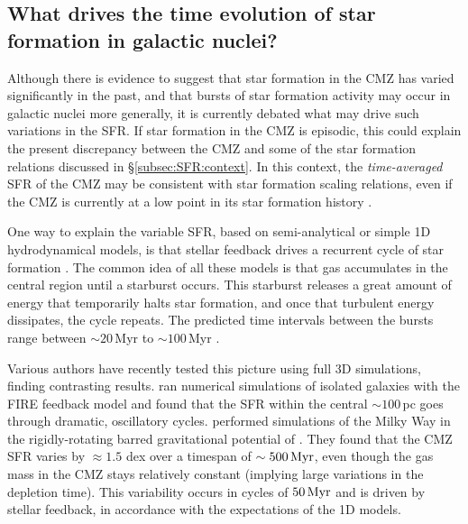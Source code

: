 \subsection{What drives the time evolution of star formation in galactic nuclei?}
\label{subsec:SFR:timeevolution}

Although there is evidence to suggest that star formation in the CMZ has varied significantly in the past, and that bursts of star formation activity may occur in galactic nuclei more generally, it is currently debated what may drive such variations in the SFR. 
If star formation in the CMZ is episodic, this could explain the present discrepancy between the CMZ and some of the star formation relations discussed in \S\ref{subsec:SFR:context}. 
In this context, the \emph{time-averaged} SFR of the CMZ may be consistent with star formation scaling relations, even if the CMZ is currently at a low point in its star formation history \citep{Kruijssen2014a, Krumholz2015}. 

One way to explain the variable SFR, based on semi-analytical or simple 1D hydrodynamical models, is that stellar feedback drives a recurrent cycle of star formation \citep{Loose1982,Krugel1993,Elmegreen1994,Morris1996,Stark2004,Kruijssen2014a,Krumholz2015,Krumholz2017,Torrey2017}. The common idea of all these models is that gas accumulates in the central region until a starburst occurs. This starburst releases a great amount of energy that temporarily halts star formation, and once that turbulent energy dissipates, the cycle repeats. The predicted time intervals between the bursts range between $\sim 20$\,Myr \citep{Krumholz2017} to $\sim 100$\,Myr \citep{Loose1982}. 

Various authors have recently tested this picture using full 3D simulations, finding contrasting results. \cite{Torrey2017} ran numerical simulations of isolated galaxies with the FIRE feedback model and found that the SFR within the central $\sim100$\,pc goes through dramatic, oscillatory cycles. \cite{Armillotta2019} performed simulations of the Milky Way in the rigidly-rotating barred gravitational potential of \cite{Ridley2017}. They found that the CMZ SFR varies by $\approx1.5$ dex over a timespan of $\sim 500\,\mbox{${\rm Myr}$}$, even though the gas mass in the CMZ stays relatively constant (implying large variations in the depletion time). This variability occurs in cycles of $50\,\mbox{${\rm Myr}$}$ and is driven by stellar feedback, in accordance with the expectations of the 1D models. 

